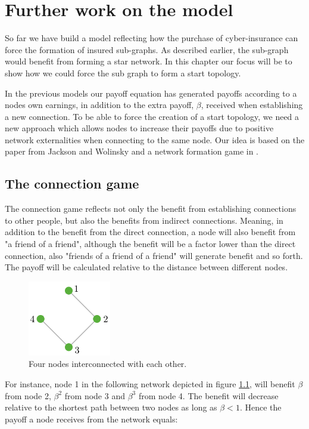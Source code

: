 \chapter{Further work on the model}
\label{secondPhaseOfModelingCyberInsurance} 

So far we have build a model reflecting how the purchase of cyber-insurance can force the formation of insured sub-graphs. As described earlier, the sub-graph would benefit from forming a star network. In this chapter our focus will be to show how we could force the sub graph to form a start topology. 

In the previous models our payoff equation has generated payoffs according to a nodes own earnings, in addition to the extra payoff, $\beta$, received when establishing a new connection. To be able to force the creation of a start topology, we need a new approach which allows nodes to increase their payoffs due to positive network externalities when connecting to the same node. Our idea is based on the paper from Jackson and Wolinsky \cite{jackson1996strategic} and a network formation game in \cite{jackson2005survey}. 

\section{The connection game}
The connection game reflects not only the benefit from establishing connections to other people, but also the benefits from indirect connections. Meaning, in addition to the benefit from the direct connection, a node will also benefit from "a friend of a friend", although the benefit will be a factor lower than the direct connection, also "friends of a friend of a friend" will generate benefit and so forth. The payoff will be calculated relative to the distance between different nodes.


\begin{figure}[h]
\centering
  \includegraphics[width=0.2\linewidth]{../Figures/connectionGame.png}
  \caption{\label{fig:connectionGame} Four nodes interconnected with each other.}
\end{figure}For instance, node 1 in the following network depicted in figure \ref{fig:connectionGame}, will benefit $\beta$ from node 2, $\beta^{2}$ from node 3 and $\beta^{3}$ from node 4. The benefit will decrease relative to the shortest path between two nodes as long as $\beta < 1$. Hence the payoff a node receives from the network equals: 

